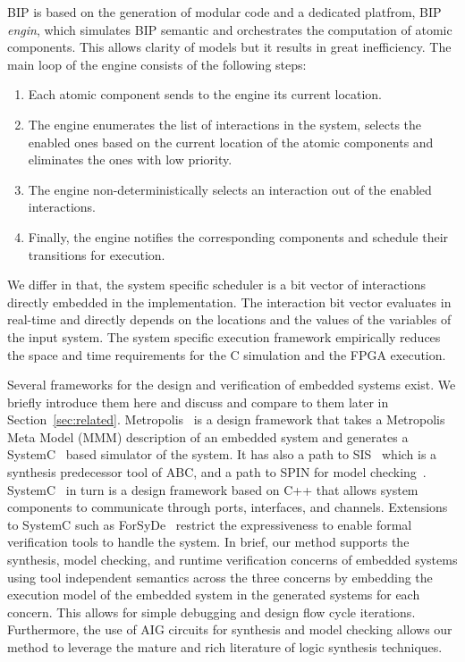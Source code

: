 BIP is based on the generation of modular code and a dedicated platfrom, BIP \emph{engin}, which simulates BIP semantic and orchestrates the computation of atomic components. This allows clarity of models but it results in great inefficiency. The main loop of the engine consists of the following steps:
\begin{enumerate}
\item Each atomic component sends to the engine its current location.
\item The engine enumerates the list of interactions in the system, 
  selects the enabled ones based on the current location of the atomic 
  components and eliminates the ones with low priority.
\item The engine non-deterministically selects an interaction out of the enabled interactions.
\item Finally, the engine notifies the corresponding components and schedule their transitions for execution. 
\end{enumerate}
We differ in that, the system specific scheduler is a bit vector of interactions directly embedded in the implementation. 
The interaction bit vector evaluates in real-time and directly depends on the locations and the values of the variables of the input system. 
The system specific execution framework empirically reduces the space and time requirements for the C simulation and the FPGA execution. 

Several frameworks for the design and verification of embedded systems exist. 
We briefly introduce them here and discuss and compare to them later in 
Section~\ref{sec:related}.
Metropolis~\cite{metropolis1,metropolis2} is a design framework that
takes a Metropolis Meta Model (MMM) description of an embedded system 
and generates a SystemC~\cite{systemc} based simulator of the system.
It has also a path to SIS~\cite{brayton92sis} which is a synthesis predecessor tool 
of ABC, and a path to SPIN for model checking~\cite{HolzSpin97}. 
SystemC~\cite{systemc} in turn is a design framework based on C++ that allows
system components to communicate through ports, interfaces, and channels.
Extensions to SystemC such as ForSyDe~\cite{SanderJ04} restrict the 
expressiveness to enable formal verification tools to handle the system. 
In brief, our method supports the synthesis, model checking, and runtime verification 
concerns of embedded systems using tool independent semantics across the three concerns
by embedding the execution model of the embedded system in the generated systems 
for each concern. 
This allows for simple debugging and design flow cycle iterations. Furthermore, 
the use of AIG circuits for synthesis and model checking allows our method to leverage
the mature and rich literature of logic synthesis techniques. 

